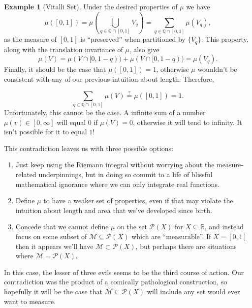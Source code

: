 \documentclass{article}
\newcommand{\R}{\mathbb{R}}
\newcommand{\Q}{\mathbb{Q}}
\newcommand{\M}{\mathcal{M}}
\theoremstyle{definition}
\newtheorem{example}{Example}[section]
\begin{document}
\begin{example}[Vitalli Set]
Under the desired properties of $\mu$ we have 
$$  \mu([0,1]) = \mu\left(\bigcup_{q\in \Q\cap[0,1]}V_q\right) = \sum_{q\in \Q\cap[0,1]} \mu(V_q),$$ as the measure of $[0,1]$ is ``preserved'' when partitioned by $\{V_q\}$. This property, along with the translation invariance of $\mu$, also give
$$\mu(V) = \mu(V\cap [0,1-q)) + \mu(V\cap [0,1-q))  = \mu(V_q).$$ Finally, it should be the case that $\mu([0,1]) = 1$, otherwise $\mu$ wounldn't be consistent with any of our previous intuition about length. Therefore, 

$$  \sum_{q\in \Q\cap[0,1]} \mu(V) \stackrel{?}{=}\mu([0,1]) = 1 .$$  
Unfortunately, this cannot be the case. A infinite sum of a number $\mu(v)\in[0,\infty]$ will equal $0$ if $\mu(V) = 0$, otherwise it will tend to infinity. It isn't possible for it to equal $1$! 
\end{example}


This contradiction leaves us with three possible options:
\begin{enumerate}
	\item Just keep using the Riemann integral without worrying about the measure-related underpinnings, but in doing so commit to a life of blissful mathematical ignorance where we can only integrate real functions.
	\item Define $\mu$ to have a weaker set of properties, even if that may violate the intuition about length and area that we've developed since birth. 
	\item Concede that we cannot define $\mu$ on the set $\mathcal P(X)$ for $X\subseteq \R$, and instead focus on some subset of $\mathcal M \subseteq \mathcal P(X)$ which are ``measurable''. If $X = [0,1]$ then it appears we'll have $\mathcal M\subset \mathcal P(X)$, but perhaps there are situations where $\mathcal M=\mathcal P(X)$.
\end{enumerate}
In this case, the lesser of three evils seems to be the third course of action. Our contradiction was the product of a comically pathological construction, so hopefully it will be the case that $\M\subseteq \mathcal P(X)$ will include any set would ever want to measure. 
  
\end{document}
